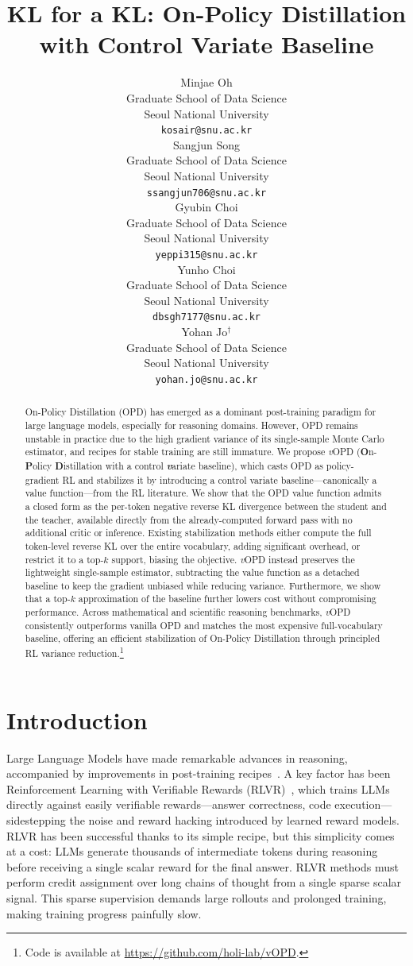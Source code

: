 \documentclass{article}
\title{KL for a KL: On-Policy Distillation with Control Variate Baseline}
\author{%
  Minjae Oh \\
  Graduate School of Data Science \\
  Seoul National University \\
  \texttt{kosair@snu.ac.kr} \\
  \And
  Sangjun Song \\
  Graduate School of Data Science \\
  Seoul National University \\
  \texttt{ssangjun706@snu.ac.kr} \\
  \AND
  Gyubin Choi \\
  Graduate School of Data Science \\
  Seoul National University \\
  \texttt{yeppi315@snu.ac.kr} \\
  \And
  Yunho Choi \\
  Graduate School of Data Science \\
  Seoul National University \\
  \texttt{dbsgh7177@snu.ac.kr} \\
  \AND
  Yohan Jo$^\dagger$ \\
  Graduate School of Data Science \\
  Seoul National University \\
  \texttt{yohan.jo@snu.ac.kr} \\
}
\newcommand{\method}{\emph{v}OPD}
\begin{document}
\maketitle
\begin{abstract}
On-Policy Distillation (OPD) has emerged as a dominant post-training paradigm for large language models, especially for reasoning domains. However, OPD remains unstable in practice due to the high gradient variance of its single-sample Monte Carlo estimator, and recipes for stable training are still immature. We propose \method{} (\textbf{O}n-\textbf{P}olicy \textbf{D}istillation with a control \emph{\textbf{v}}ariate baseline), which casts OPD as policy-gradient RL and stabilizes it by introducing a control variate baseline—canonically a value function—from the RL literature. We show that the OPD value function admits a closed form as the per-token negative reverse KL divergence between the student and the teacher, available directly from the already-computed forward pass with no additional critic or inference. Existing stabilization methods either compute the full token-level reverse KL over the entire vocabulary, adding significant overhead, or restrict it to a top-$k$ support, biasing the objective. \method{} instead preserves the lightweight single-sample estimator, subtracting the value function as a detached baseline to keep the gradient unbiased while reducing variance. Furthermore, we show that a top-$k$ approximation of the baseline further lowers cost without compromising performance.  Across mathematical and scientific reasoning benchmarks, \method{} consistently outperforms vanilla OPD and matches the most expensive full-vocabulary baseline, offering an efficient stabilization of On-Policy Distillation through principled RL variance reduction.\footnote{Code is available at \url{https://github.com/holi-lab/vOPD}.}
\end{abstract}

\def\thefootnote{\fnsymbol{footnote}}
\def\thefootnote{\arabic{footnote}}

\section{Introduction}
Large Language Models have made remarkable advances in reasoning, accompanied by improvements in post-training recipes~\citep{jaech2024openai, yang2025qwen3, team2025kimi}. A key factor has been Reinforcement Learning with Verifiable Rewards (RLVR)~\citep{lambert2024tulu, guo2025deepseek}, which trains LLMs directly against easily verifiable rewards---answer correctness, code execution---sidestepping the noise and reward hacking introduced by learned reward models. RLVR has been successful thanks to its simple recipe, but this simplicity comes at a cost: LLMs generate thousands of intermediate tokens during reasoning before receiving a single scalar reward for the final answer. RLVR methods must perform credit assignment over long chains of thought from a single sparse scalar signal. This sparse supervision demands large rollouts and prolonged training, making training progress painfully slow.
\end{document}
